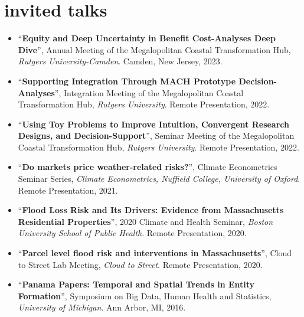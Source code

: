 \documentclass[10pt,oneside]{article}
\begin{document}
\mbox{}\vspace{-\dimexpr\baselineskip\relax}
\vspace*{-1em}
\printbibliography[type=report, heading=none]


\section{invited talks}

\mbox{}\vspace{-\dimexpr\baselineskip\relax}

\begin{itemize}[label={}]
  
  \item \enquote{\textbf{Equity and Deep Uncertainty in Benefit Cost-Analyses Deep Dive}}, Annual Meeting of the Megalopolitan Coastal Transformation Hub,  \textit{Rutgers University-Camden}. Camden, New Jersey, 2023.
  
  \item \enquote{\textbf{Supporting Integration Through MACH Prototype Decision-Analyses}}, Integration Meeting of the Megalopolitan Coastal Transformation Hub,  \textit{Rutgers University}. Remote Presentation, 2022.
  
  \item \enquote{\textbf{Using Toy Problems to Improve Intuition, Convergent Research Designs, and Decision-Support}}, Seminar Meeting of the Megalopolitan Coastal Transformation Hub,  \textit{Rutgers University}. Remote Presentation, 2022.
  
  \item \enquote{\textbf{Do markets price weather-related risks?}}, Climate Econometrics Seminar Series,  \textit{Climate Econometrics, Nuffield College, University of Oxford}. Remote Presentation, 2021.
  
  \item \enquote{\textbf{Flood Loss Risk and Its Drivers: Evidence from Massachusetts Residential Properties}}, 2020 Climate and Health Seminar,  \textit{Boston University School of Public Health}. Remote Presentation, 2020.
  
  \item \enquote{\textbf{Parcel level flood risk and interventions in Massachusetts}}, Cloud to Street Lab Meeting,  \textit{Cloud to Street}. Remote Presentation, 2020.
  
  \item \enquote{\textbf{Panama Papers: Temporal and Spatial Trends in Entity Formation}}, Symposium on Big Data, Human Health and Statistics,  \textit{University of Michigan}. Ann Arbor, MI, 2016.
  
\end{itemize}
\end{document}
